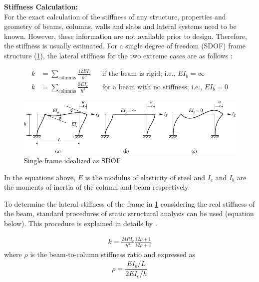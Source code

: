 \documentclass[onecolumn, fleqn]{article}
\newcommand{\kip}{\ensuremath{\,\mathrm{k}}}
\begin{document}

\vspace{10mm}
\noindent\textbf{Stiffness Calculation:}\\
\indent For the exact calculation of the stiffness of any structure, properties and geometry of beams, columns, walls and slabs and lateral systems need to be known. However, these information are not available prior to design. Therefore, the stiffness is usually estimated. For a single degree of freedom (SDOF) frame structure (\cref{fig:frame_sdof}), the lateral stiffness for the two extreme cases are as follows \citep{ChopraAnilK2012Dos}:

\begin{align*}
k &= \sum_\mathrm{columns} \frac{12 E I_c}{h^3}	&& \text{if the beam is rigid; i.e., } EI_b = \infty		\\
k &= \sum_\mathrm{columns} \frac{3 E I_c}{h^3}	&& \text{for a beam with no stiffness; i.e., } EI_b = 0
\end{align*}
\begin{figure}[H]
	\centering \includegraphics[width=0.9\linewidth]{frame_sdof.pdf}
	\caption{Single frame idealized as SDOF \citep{ChopraAnilK2012Dos}}
	\label{fig:frame_sdof}
\end{figure}

In the equations above, $E$ is the modulus of elasticity of steel and $I_c$ and $I_b$ are the moments of inertia of the column and beam respectively.

To determine the lateral stiffness of the frame in \cref{fig:frame_sdof} considering the real stiffness of the beam, standard procedures of static structural analysis can be used (equation below). This procedure is explained in details by \citet{ChopraAnilK2012Dos}.

\begin{gather*}
k = \frac{24 R I_c}{h^3} \frac{12 \rho + 1}{12 \rho + 4}
\end{gather*}
where $\rho$ is the beam-to-column stiffness ratio and expressed as 
\begin{gather*}
\rho = \dfrac{EI_b / L}{2 E I_c/h}
\end{gather*}
\end{document}
